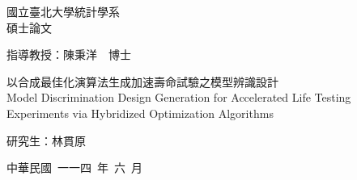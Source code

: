   
\usepackage{wallpaper}                               
\usepackage{changepage}


\fontsize{12}{22pt}\selectfont
\begin{center}
    \huge 國立臺北大學統計學系 \\ 碩士論文
\end{center}
\vspace*{2cm}
\begin{center}
    \LARGE 指導教授：陳秉洋~~博士 \\
\end{center}
\vspace*{2cm}
\begin{center}
    \LARGE 以合成最佳化演算法生成加速壽命試驗之模型辨識設計 \\
    \vspace*{1cm}
    Model Discrimination Design Generation for Accelerated Life Testing Experiments via Hybridized Optimization Algorithms
\end{center}
\vspace*{3cm}
\begin{center}
    \LARGE 研究生：林貫原
\end{center} 
\vspace*{3cm}
\begin{center}
    \LARGE 中華民國~一一四~年~六~月
\end{center}




\newpage
%  
\thispagestyle{empty}


   	

\newpage
\fontsize{12}{22pt}\selectfont 	
\fancyfoot[C]{\thepage}

\cleardoublepage
\setcounter{tocdepth}{2} 

\tableofcontents
\newpage
\listoffigures 
\newpage
\listoftables 
\newpage

\ifodd{} \else \thispagestyle{empty}\mbox{}\clearpage\fi 
{} 		
\setcounter{page}{1} 






\nocite{*}               


